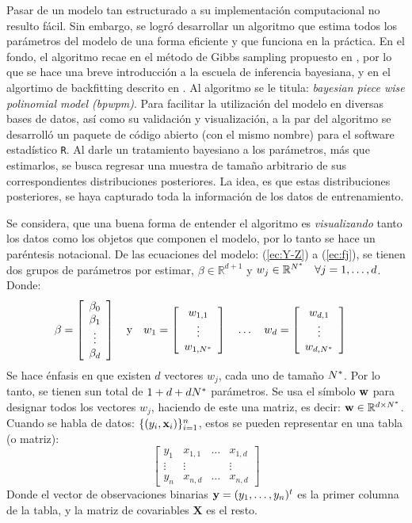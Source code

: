 \documentclass[../Main/Main.tex]{subfiles}
\begin{document}
Pasar de un modelo tan estructurado a su implementación computacional no resulto fácil. Sin embargo, se logró desarrollar un algoritmo que estima todos los parámetros del modelo de una forma eficiente y que funciona en la práctica. En el fondo, el algoritmo recae en el método de Gibbs sampling propuesto en \autocite{albert1993bayesian}, por lo que se hace una breve introducción a la escuela de inferencia bayesiana, y en el algortimo de backfitting descrito en \autocite{hastie1986generalized}. Al algoritmo se le titula: \textit{bayesian piece wise polinomial model (bpwpm)}. Para facilitar la utilización del modelo en diversas bases de datos, así como  su validación y visualización, a la par del algoritmo se desarrolló un paquete de código abierto (con el mismo nombre) para el software estadístico \verb|R|. Al darle un tratamiento bayesiano a los parámetros, más que estimarlos, se busca regresar una muestra de tamaño arbitrario de sus correspondientes distribuciones posteriores. La idea, es que estas distribuciones posteriores, se haya capturado toda la información de los datos de entrenamiento. 

Se considera, que una buena forma de entender el algoritmo es \textit{visualizando} tanto los datos como los objetos que componen el modelo, por lo tanto se hace un paréntesis notacional. De las ecuaciones del modelo: (\ref{ec:Y-Z}) a (\ref{ec:fj}), se tienen dos grupos de parámetros por estimar, $\beta \in \mathbb{R}^{d+1}$ y $w_j \in \mathbb{R}^{N^*} \quad \forall j = 1,\ldots,d$. Donde:
\begin{align*}
\beta &= 
\left[ 
	\begin{array}{c}
	\beta_0 \\
	\beta_1 \\ 
	\vdots \\
	\beta_d
	\end{array}\right]
\quad \text{y} \quad 
w_1 = 
\left[ 
	\begin{array}{c}
	w_{1,1}\\
	\vdots\\
	w_{1,N^*}
	\end{array}\right]
\quad \ldots \quad 
w_d = 
\left[ 
	\begin{array}{c}
	w_{d,1}\\
	\vdots\\
	w_{d,N^*}
	\end{array}\right]
\end{align*}
Se hace énfasis en que existen $d$ vectores $w_j$, cada uno de tamaño $N^*$. Por lo tanto, se tienen sun total de $1 + d + dN^*$ parámetros. Se usa el símbolo $\mathbf{w}$ para designar todos los vectores $w_j$, haciendo de este una matriz, es decir: $\mathbf{w}\in\mathbb{R}^{d\times N^*}$. Cuando se habla de datos: $\{(y_i,\mathbf{x}_i)\}_{i = 1}^n$, estos se pueden  representar en una tabla (o matriz):
$$\left[\begin{array}{c|ccc} 
y_1 & x_{1,1} & \ldots & x_{1,d} \\ 
\vdots & \vdots & ~ & \vdots \\ 
y_n & x_{n,d} & \ldots & x_{n,d}
\end{array}\right]$$
Donde el vector de observaciones binarias $\mathbf{y} = (y_1,\ldots,y_n)^t$ es la primer columna de la tabla, y la matriz de covariables $\mathbf{X}$ es el resto.
\end{document}
